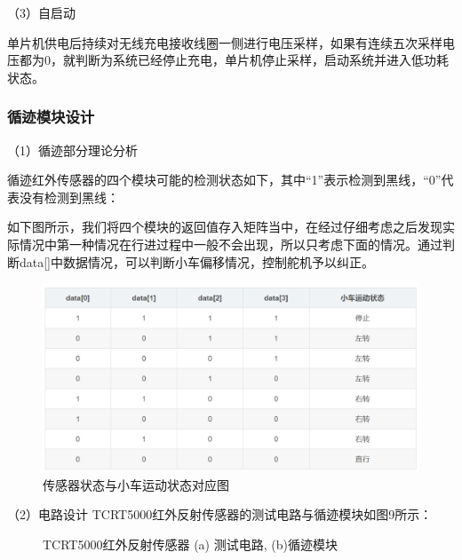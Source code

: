 \documentclass[UTF8]{ctexart}
\begin{document}
（3）自启动

单片机供电后持续对无线充电接收线圈一侧进行电压采样，如果有连续五次采样电压都为0，就判断为系统已经停止充电，单片机停止采样，启动系统并进入低功耗状态。

\subsubsection{循迹模块设计}
（1）循迹部分理论分析

循迹红外传感器的四个模块可能的检测状态如下，其中“1”表示检测到黑线，“0”代表没有检测到黑线：

如下图所示，我们将四个模块的返回值存入矩阵当中，在经过仔细考虑之后发现实际情况中第一种情况在行进过程中一般不会出现，所以只考虑下面的情况。通过判断data[]中数据情况，可以判断小车偏移情况，控制舵机予以纠正。

\begin{figure}[H]   
	\centering	        \includegraphics[width=0.83\linewidth]{F8.png}
	\caption{传感器状态与小车运动状态对应图}	  
	\label{fig8} 
\end{figure}


（2）电路设计
TCRT5000红外反射传感器的测试电路与循迹模块\cite{num1}如图9所示：
\begin{figure}[H]   
	\centering	  
	\label{1a}\hfil
	\label{1b}
	\caption{TCRT5000红外反射传感器 (a) 测试电路, (b)循迹模块}	  
	\label{fig9} 
\end{figure}
\end{document}
